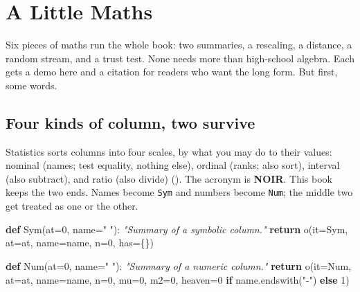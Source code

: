 \documentclass[
  justified]{tufte-book}
\newenvironment{Shaded}{}{}
\newcommand{\CommentTok}[1]{\textcolor[rgb]{0.38,0.63,0.69}{\textit{#1}}}
\newcommand{\ControlFlowTok}[1]{\textcolor[rgb]{0.00,0.44,0.13}{\textbf{#1}}}
\newcommand{\DecValTok}[1]{\textcolor[rgb]{0.25,0.63,0.44}{#1}}
\newcommand{\KeywordTok}[1]{\textcolor[rgb]{0.00,0.44,0.13}{\textbf{#1}}}
\newcommand{\NormalTok}[1]{#1}
\newcommand{\OperatorTok}[1]{\textcolor[rgb]{0.40,0.40,0.40}{#1}}
\newcommand{\StringTok}[1]{\textcolor[rgb]{0.25,0.44,0.63}{#1}}
\begin{document}
\chapter{A Little Maths}\label{a-little-maths}

Six pieces of maths run the whole book: two summaries, a rescaling, a
distance, a random stream, and a trust test. None needs more than
high-school algebra. Each gets a demo here and a citation for readers
who want the long form. But first, some words.

\section{Four kinds of column, two
survive}\label{four-kinds-of-column-two-survive}

Statistics sorts columns into four scales, by what you may do to their
values: nominal (names; test equality, nothing else), ordinal (ranks;
also sort), interval (also subtract), and ratio (also divide)
(). The acronym is \textbf{NOIR}.
This book keeps the two ends. Names become \texttt{Sym} and numbers
become \texttt{Num}; the middle two get treated as one or the other.

\begin{Shaded}
\begin{Highlighting}[]
\KeywordTok{def}\NormalTok{ Sym(at}\OperatorTok{=}\DecValTok{0}\NormalTok{, name}\OperatorTok{=}\StringTok{" "}\NormalTok{):}
  \CommentTok{"Summary of a symbolic column."}
  \ControlFlowTok{return}\NormalTok{ o(it}\OperatorTok{=}\NormalTok{Sym, at}\OperatorTok{=}\NormalTok{at, name}\OperatorTok{=}\NormalTok{name, n}\OperatorTok{=}\DecValTok{0}\NormalTok{, has}\OperatorTok{=}\NormalTok{\{\})}
\end{Highlighting}
\end{Shaded}

\begin{Shaded}
\begin{Highlighting}[]
\KeywordTok{def}\NormalTok{ Num(at}\OperatorTok{=}\DecValTok{0}\NormalTok{, name}\OperatorTok{=}\StringTok{" "}\NormalTok{):}
  \CommentTok{"Summary of a numeric column."}
  \ControlFlowTok{return}\NormalTok{ o(it}\OperatorTok{=}\NormalTok{Num, at}\OperatorTok{=}\NormalTok{at, name}\OperatorTok{=}\NormalTok{name, n}\OperatorTok{=}\DecValTok{0}\NormalTok{, mu}\OperatorTok{=}\DecValTok{0}\NormalTok{, m2}\OperatorTok{=}\DecValTok{0}\NormalTok{,}
\NormalTok{           heaven}\OperatorTok{=}\DecValTok{0} \ControlFlowTok{if}\NormalTok{ name.endswith(}\StringTok{"{-}"}\NormalTok{) }\ControlFlowTok{else} \DecValTok{1}\NormalTok{)}
\end{Highlighting}
\end{Shaded}
\end{document}

